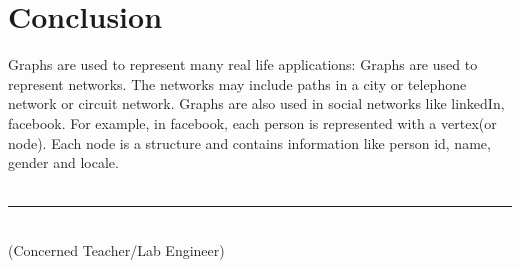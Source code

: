 \documentclass[11pt]{article}            %
\newcommand\tab[1][1cm]{\hspace*{#1}}
\begin{document}
\section{Conclusion}
\justify Graphs are used to represent many real life applications: Graphs are used to represent networks. The networks may include paths in a city or telephone network or circuit network. Graphs are also used in social networks like linkedIn, facebook. For example, in facebook, each person is represented with a vertex(or node). Each node is a structure and contains information like person id, name, gender and locale.\\~\\

\tab[6cm] \noindent\rule{6cm}{0.4pt}\\
\tab[6cm] (Concerned Teacher/Lab Engineer)


 
\end{document}

